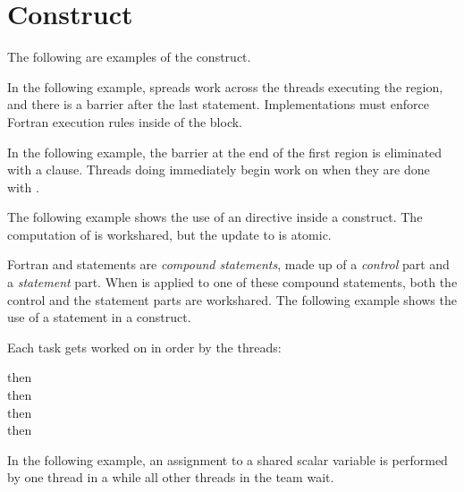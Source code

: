 \section{ Construct}
\fortranspecificstart
\label{sec:workshare}

The following are examples of the  construct. 

In the following example,  spreads work across the threads executing 
the  region, and there is a barrier after the last statement. 
Implementations must enforce Fortran execution rules inside of the  
block.


In the following example, the barrier at the end of the first  
region is eliminated with a  clause. Threads doing  immediately begin work on  when they are done with .

\pagebreak
{}

The following example shows the use of an  directive inside a  
construct. The computation of  is workshared, but the update to 
 is atomic.


Fortran  and  statements are \emph{compound statements}, 
made up of a \emph{control} part and a \emph{statement} part. When  
is applied to one of these compound statements, both the control and the statement 
parts are workshared. The following example shows the use of a  statement 
in a  construct.

Each task gets worked on in order by the threads:

 then
\\
 then
\\
 then
\\
 then
\\


In the following example, an assignment to a shared scalar variable is performed 
by one thread in a  while all other threads in the team wait.

